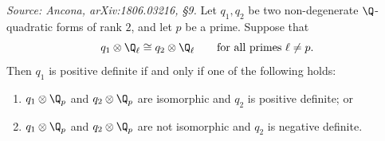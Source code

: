 \begin{corollary}
  \label{cor:signature-top}
  \textit{Source: Ancona, arXiv:1806.03216, §9.}
  Let \(q_1, q_2\) be two non-degenerate \(\Q\)-quadratic forms of rank \(2\),
  and let \(p\) be a prime. Suppose that
  \[q_1 \otimes \Q_\ell \cong q_2 \otimes \Q_\ell \qquad
    \text{for all primes } \ell \neq p.\]
  Then \(q_1\) is positive definite if and only if one of the following holds:
  \begin{enumerate}
    \item \(q_1 \otimes \Q_p\) and \(q_2 \otimes \Q_p\) are isomorphic and
      \(q_2\) is positive definite; or
    \item \(q_1 \otimes \Q_p\) and \(q_2 \otimes \Q_p\) are not isomorphic and
      \(q_2\) is negative definite.
  \end{enumerate}
\end{corollary}

